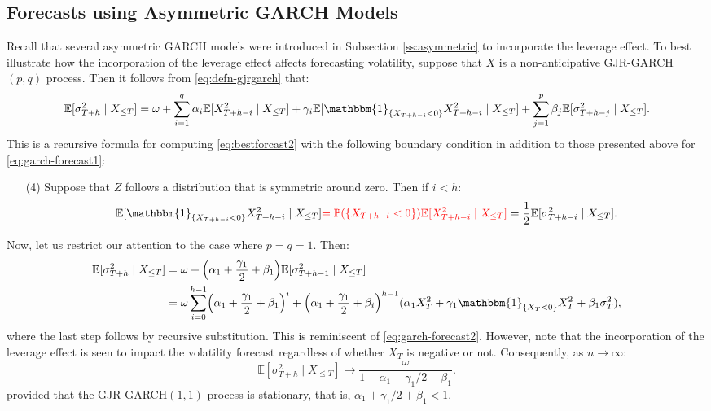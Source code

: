 \subsection{Forecasts using Asymmetric GARCH Models}
Recall that several asymmetric GARCH models were introduced in Subsection \ref{ss:asymmetric} to incorporate the leverage effect. To best illustrate how the incorporation of the leverage effect affects forecasting volatility, suppose that $X$ is a non-anticipative GJR-GARCH$(p,q)$ process. Then it follows from \eqref{eq:defn-gjrgarch} that:
\begin{equation*}
    \mathbb{E}[\sigma_{T+h}^{2}\mid X_{\leq T}]=\omega+\sum_{i=1}^{q}\alpha_{i}\mathbb{E}[X_{T+h-i}^{2}\mid X_{\leq T}]+\gamma_{i}\mathbb{E}[\mathbbm{1}_{\{X_{T+h-i}<0\}}X_{T+h-i}^{2}\mid X_{\leq T}]
    +\sum_{j=1}^{p}\beta_{j}\mathbb{E}[\sigma_{T+h-j}^{2}\mid X_{\leq T}].
\end{equation*}
This is a recursive formula for computing \eqref{eq:bestforcast2} with the following boundary condition in addition to those presented above for \eqref{eq:garch-forecast1}:
\begin{enumerate}
    \item[(4)] Suppose that $Z$ follows a distribution that is symmetric around zero. Then if $i<h$:
    \begin{equation*}
        \mathbb{E}[\mathbbm{1}_{\{X_{T+h-i}<0\}}X_{T+h-i}^{2}\mid X_{\leq T}]\textcolor{red}{=\mathbb{P}(\{X_{T+h-i}<0\})\mathbb{E}[X_{T+h-i}^{2}\mid X_{\leq T}]}=\frac{1}{2}\mathbb{E}[\sigma_{T+h-i}^{2}\mid X_{\leq T}].
    \end{equation*}
\end{enumerate}
Now, let us restrict our attention to the case where $p=q=1$. Then:
\begin{align*}
    \mathbb{E}[\sigma_{T+h}^{2}\mid X_{\leq T}]&=\omega+\left(\alpha_{1}+\frac{\gamma_{1}}{2}+\beta_{1}\right)\mathbb{E}[\sigma_{T+h-1}^{2}\mid X_{\leq T}]\\
    &=\omega\sum_{i=0}^{h-1}\left(\alpha_{1}+\frac{\gamma_{1}}{2}+\beta_{1}\right)^{i}+\left(\alpha_{1}+\frac{\gamma_{1}}{2}+\beta_{i}\right)^{h-1}(\alpha_{1}X_{T}^{2}+\gamma_{1}\mathbbm{1}_{\{X_{T}<0\}}X_{T}^{2}+\beta_{1}\sigma_{T}^{2}),
\end{align*}
where the last step follows by recursive substitution. This is reminiscent of \eqref{eq:garch-forecast2}. However, note that the incorporation of the leverage effect is seen to impact the volatility forecast regardless of whether $X_{T}$ is negative or not. Consequently, as $n\to\infty$:
\begin{equation*}
    \mathbb{E}[\sigma_{T+h}^{2}\mid X_{\leq T}]\to\frac{\omega}{1-\alpha_{1}-\gamma_{1}/2-\beta_{1}}.
\end{equation*}
provided that the GJR-GARCH$(1,1)$ process is stationary, that is, $\alpha_{1}+\gamma_{1}/2+\beta_{1}<1$.

